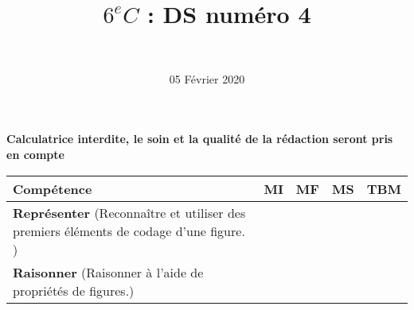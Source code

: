 \documentclass[a4paper,11pt]{exam}
\author{\ }
\date{05 Février 2020}
\title{$6^e C$ : DS num\'ero 4}
\begin{document}
%	

	\maketitle
	
\begin{center}
	\textbf{Calculatrice interdite, le soin et la qualité de la rédaction seront pris en compte}
\end{center}

\begin{small}
	\begin{center}
		\begin{tabular}{|@{\ }l@{\ }|@{\ }c@{\ }|@{\ }c@{\ }|@{\ }c@{\ }|@{\ }c@{\ }|}
			\hline
			\textbf{Compétence} & \textbf{MI} & \textbf{MF} & \textbf{MS} & \textbf{TBM} \\
			\hline
			\textbf{Représenter} (Reconnaître et utiliser des premiers éléments de codage d'une figure. ) &  \ \ & \ \ & \ \ & \ \  \\
			\hline	
			\textbf{Raisonner} (Raisonner à l'aide de propriétés de figures.) & \ \ & \ \ &  \ \  & \ \ \\
			\hline
		\end{tabular}
	\end{center}
\end{small}	

	
	
	


















\label{LastPage}
\end{document}
